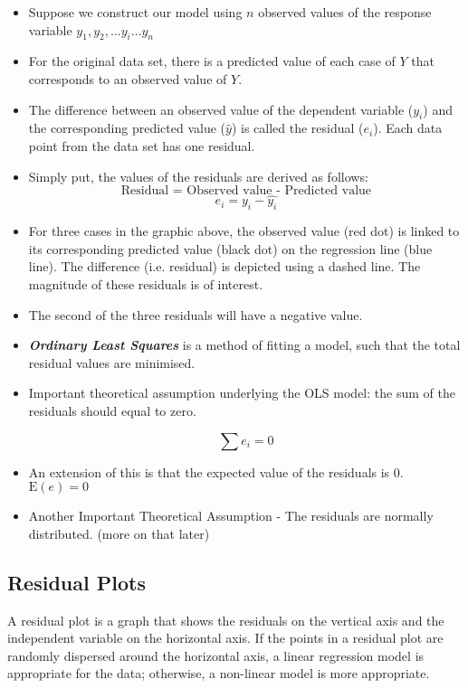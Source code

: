 \documentclass[residuals.tex]{subfiles}
\begin{document}
\begin{itemize}
\item Suppose we construct our model using $n$ observed values of the response variable $y_1, y_2, \ldots y_i \ldots y_n$

\item For the original data set, there is a predicted value of each case of $Y$ that corresponds to an observed value of $Y$. 

\item The difference between an observed value of the dependent variable ($y_i$) and the corresponding predicted value ($\hat{y}$) is called the residual ($e_i$). Each data point from the data set has one residual.

\item Simply put, the values of the residuals are derived as follows: 
\[\mbox{Residual = Observed value - Predicted value}\]
\[e_i = y_i - \hat{y_i} \]
\item For three cases in the graphic above, the observed value (red dot) is linked to its corresponding predicted value (black dot) on the regression line (blue line).
The difference (i.e. residual) is depicted using a dashed line. The magnitude of these residuals is of interest.
\item The second of the three residuals will have a negative value.
\item \textbf{\textit{Ordinary Least Squares}} is a method of fitting a model, such that the total residual values are minimised.


\item Important theoretical assumption underlying the OLS model: the sum of the residuals should equal to zero. 

{
\Large
\[\sum e_i = 0\]
}
\item An extension of this is that the expected value of the residuals is 0. 
$\mathrm{E}(e) = 0$
\item Another Important Theoretical Assumption - The residuals are normally distributed. (more on that later)
\end{itemize}

\subsection{Residual Plots}
A residual plot is a graph that shows the residuals on the vertical axis and the independent variable on the horizontal axis. If the points in a residual plot are randomly dispersed around the horizontal axis, a linear regression model is appropriate for the data; otherwise, a non-linear model is more appropriate.
\end{document}
